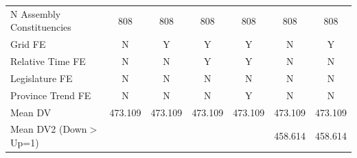 {\begin{tabular}{l*{6}{c}}
N Assembly Constituencies&         808         &         808         &         808         &         808         &         808         &         808         \\
Grid FE     &           N         &           Y         &           Y         &           Y         &           N         &           Y         \\
Relative Time FE&           N         &           N         &           Y         &           Y         &           N         &           N         \\
Legislature FE&           N         &           N         &           N         &           N         &           N         &           N         \\
Province Trend FE&           N         &           N         &           N         &           Y         &           N         &           N         \\
Mean DV     &     473.109         &     473.109         &     473.109         &     473.109         &     473.109         &     473.109         \\
Mean DV2 (Down$>$Up=1)&                     &                     &                     &                     &     458.614         &     458.614         \\
\hline
\end{tabular}
}
